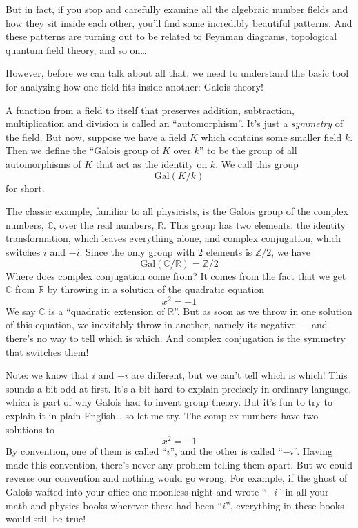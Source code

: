\documentclass{article}
\begin{document}
But in fact, if you stop and carefully examine all the algebraic number
fields and how they sit inside each other, you'll find some incredibly
beautiful patterns. And these patterns are turning out to be related to
Feynman diagrams, topological quantum field theory, and so on\ldots{}

However, before we can talk about all that, we need to understand the
basic tool for analyzing how one field fits inside another: Galois
theory!

A function from a field to itself that preserves addition, subtraction,
multiplication and division is called an ``automorphism''. It's just a
\emph{symmetry} of the field. But now, suppose we have a field \(K\)
which contains some smaller field \(k\). Then we define the ``Galois
group of \(K\) over \(k\)'' to be the group of all automorphisms of
\(K\) that act as the identity on \(k\). We call this group
\[\mathrm{Gal}(K/k)\] for short.

The classic example, familiar to all physicists, is the Galois group of
the complex numbers, \(\mathbb{C}\), over the real numbers,
\(\mathbb{R}\). This group has two elements: the identity
transformation, which leaves everything alone, and complex conjugation,
which switches \(i\) and \(-i\). Since the only group with 2 elements is
\(\mathbb{Z}/2\), we have
\[\mathrm{Gal}(\mathbb{C}/\mathbb{R}) = \mathbb{Z}/2\] Where does
complex conjugation come from? It comes from the fact that we get
\(\mathbb{C}\) from \(\mathbb{R}\) by throwing in a solution of the
quadratic equation \[x^2 = -1\] We say \(\mathbb{C}\) is a ``quadratic
extension of \(\mathbb{R}\)''. But as soon as we throw in one solution
of this equation, we inevitably throw in another, namely its negative
--- and there's no way to tell which is which. And complex conjugation
is the symmetry that switches them!

Note: we know that \(i\) and \(-i\) are different, but we can't tell
which is which! This sounds a bit odd at first. It's a bit hard to
explain precisely in ordinary language, which is part of why Galois had
to invent group theory. But it's fun to try to explain it in plain
English\ldots{} so let me try. The complex numbers have two solutions to
\[x^2 = -1\] By convention, one of them is called ``\(i\)'', and the
other is called ``\(-i\)''. Having made this convention, there's never
any problem telling them apart. But we could reverse our convention and
nothing would go wrong. For example, if the ghost of Galois wafted into
your office one moonless night and wrote ``\(-i\)'' in all your math and
physics books wherever there had been ``\(i\)'', everything in these
books would still be true!
\end{document}
